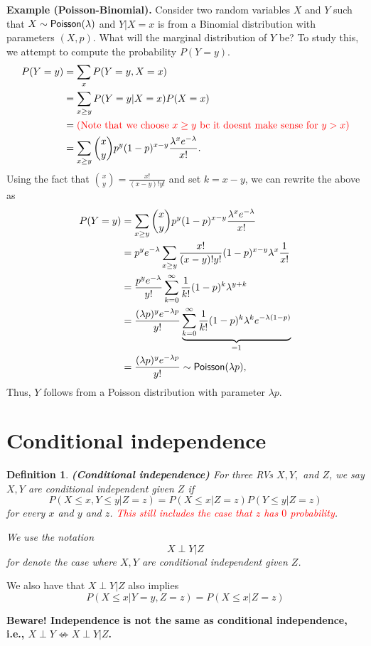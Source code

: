 \documentclass[twoside]{article}
\newcommand{\note}[1]{\textcolor{red}{#1}}
\newtheorem{definition}[theorem]{Definition}
\begin{document}
{\bf Example (Poisson-Binomial). }
Consider two random variables $X$ and $Y$ such that $X\sim {\sf Poisson}(\lambda)$
and $Y|X=x$ is from a Binomial distribution with parameters $(X,p)$.
What will the marginal distribution of $Y$ be?
To study this, we attempt to compute the probability $P(Y=y).$
\begin{align*}
P(Y=y) & = \sum_xP(Y=y,X=x)\\
& = \sum_{x\geq y}P(Y=y|X=x)P(X=x)\\
&= \note{\mbox{(Note that we choose $x\geq y$ bc it doesnt make sense for $y>x$)}}\\
& = \sum_{x\geq y} {x\choose y}p^y (1-p)^{x-y}\frac{\lambda^x e^{-\lambda}}{x!}.
\end{align*}
Using the fact that ${x\choose y} = \frac{x!}{(x-y)! y!}$ and set $k=x-y$, we can rewrite the above as
\begin{align*}
P(Y=y) & = \sum_{x\geq y} {x\choose y}p^y (1-p)^{x-y}\frac{\lambda^x e^{-\lambda}}{x!}\\
&=p^ye^{-\lambda} \sum_{x\geq y}  \frac{x!}{(x-y)! y!}(1-p)^{x-y}\lambda^x \frac{1}{x!}\\
& =\frac{p^ye^{-\lambda}}{y!} \sum_{k=0}^\infty  \frac{1}{k!}(1-p)^k \lambda^{y+k}\\
& =\frac{(\lambda p)^ye^{-\lambda p}}{y!} \underbrace{\sum_{k=0}^\infty  \frac{1}{k!}(1-p)^k \lambda^{k}e^{-\lambda(1-p)}}_{=1}\\
& =\frac{(\lambda p)^ye^{-\lambda p}}{y!} \sim {\sf Poisson}(\lambda p),
\end{align*}
Thus, $Y$ follows from a Poisson distribution with parameter $\lambda p$.


\section{Conditional independence}
\begin{definition}
    {\bf (Conditional independence)} For three RVs $X,Y,$ and $Z$,
we say $X,Y$ are conditional independent given $Z$ 
if
$$
P(X\leq x,Y\leq y|Z= z) = P(X\leq x|Z=z) P(Y\leq y|Z=z)
$$
for every $x$ and $y$ 
and $z$. \note{This still includes the case that $z$ has $0$ probability}.

We use the notation
$$
X\perp Y|Z
$$
for denote the case where $X,Y$ are conditional independent given $Z$.
\end{definition}
We also have that  $X\perp Y|Z$ also implies
$$
P(X\leq x|Y=y,Z= z) = P(X\leq x|Z=z)
$$


{\bf Beware! Independence is not the same as conditional independence, i.e., $X\perp Y\not\Leftrightarrow X\perp Y|Z$. }
\end{document}
